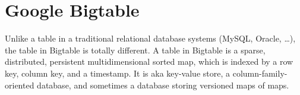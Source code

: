 \chapter{Google Bigtable}
\label{chap:google_bigtable}

Unlike a table in a traditional relational database systems (MySQL, Oracle,
\ldots), the table in Bigtable is totally different. 
A table in Bigtable is a
sparse, distributed, persistent multidimensional sorted map, which is indexed by
a row key, column key, and a timestamp.
It is aka 
key-value store, a column-family-oriented database, and sometimes a database
storing versioned maps of maps.




